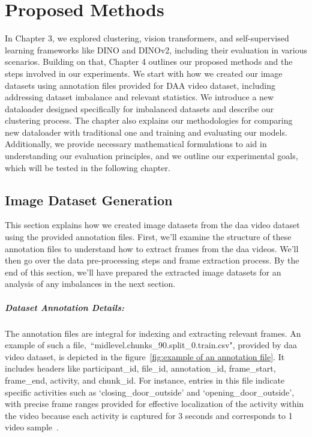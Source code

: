 \chapter{Proposed Methods}
\label{chapter:proposed_methods}
In Chapter 3, we explored clustering, vision transformers, and self-supervised learning frameworks like DINO and DINOv2, including their evaluation in various scenarios. Building on that, Chapter 4 outlines our proposed methods and the steps involved in our experiments. We start with how we created our image datasets using annotation files provided for DAA video dataset, including addressing dataset imbalance and relevant statistics. We introduce a new dataloader designed specifically for imbalanced datasets and describe our clustering process. The chapter also explains our methodologies for comparing new dataloader with traditional one and training and evaluating our models. Additionally, we provide necessary mathematical formulations to aid in understanding our evaluation principles, and we outline our experimental goals, which will be tested in the following chapter.

\section{Image Dataset Generation}
This section explains how we created image datasets from the \gls{daa} video dataset~\citep{martin2019drive_and_act_2019_iccv} using the provided annotation files. First, we'll examine the structure of these annotation files to understand how to extract frames from the \gls{daa} videos. We'll then go over the data pre-processing steps and frame extraction process. By the end of this section, we'll have prepared the extracted image datasets for an analysis of any imbalances in the next section.

\paragraph{Dataset Annotation Details:} The annotation files are integral for indexing and extracting relevant frames. An example of such a file,~``midlevel.chunks\_90.split\_0.train.csv", provided by \gls{daa}~\citep{martin2019drive_and_act_2019_iccv} video dataset, is depicted in the figure~\ref{fig:example of an annotation file}. It includes headers like participant\_id, file\_id, annotation\_id, frame\_start, frame\_end, activity, and chunk\_id. For instance, entries in this file indicate specific activities such as `closing\_door\_outside' and `opening\_door\_outside', with precise frame ranges provided for effective localization of the activity within the video because each activity is captured for 3 seconds and corresponds to 1 video sample~\citep{martin2019drive_and_act_2019_iccv}.

